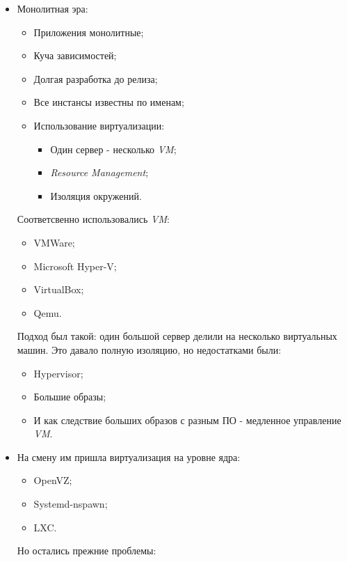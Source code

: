 \begin{itemize}
    \item Монолитная эра:
        \begin{itemize}
            \item Приложения монолитные;
            \item Куча зависимостей;
            \item Долгая разработка до релиза;
            \item Все инстансы известны по именам;
            \item Использование виртуализации:
                \begin{itemize}
                    \item Один сервер - несколько \textit{VM};
                    \item \textit{Resource Management};
                    \item Изоляция окружений.
                \end{itemize}
        \end{itemize}
        Соответсвенно использовались \textit{VM}:
        \begin{itemize}
            \item VMWare;
            \item Microsoft Hyper-V;
            \item VirtualBox;
            \item Qemu.
        \end{itemize}
        Подход был такой: один большой сервер делили на несколько виртуальных машин. Это давало полную изоляцию, но недостатками были:
        \begin{itemize}
            \item Hypervisor;
            \item Большие образы;
            \item И как следствие больших образов с разным ПО - медленное управление \textit{VM}.
        \end{itemize}
    \item На смену им пришла виртуализация на уровне ядра:
        \begin{itemize}
            \item OpenVZ;
            \item Systemd-nspawn;
            \item LXC.
        \end{itemize}
        Но остались прежние проблемы:
        \begin{itemize}

\end{itemize}
\end{itemize}
